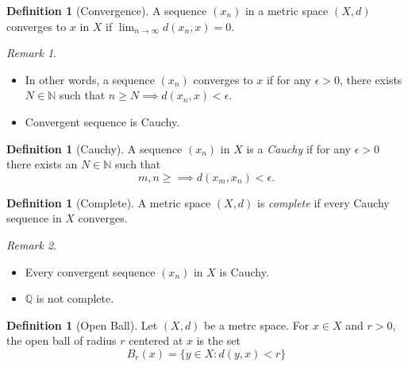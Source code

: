 \documentclass[12pt, lettersize]{article}
\theoremstyle{plain}
\theoremstyle{definition}
\newtheorem{dfn}[thm]{Definition}
\theoremstyle{remark}
\newtheorem*{rem}{Remark}
\newcommand{\N}{\mathbb{N}}
\newcommand{\Q}{\mathbb{Q}}
\begin{document}
\begin{dfn}[Convergence]
	A sequence $(x_n)$ in a metric space $(X,d)$ converges to $x$ in $X$ if $\lim_{n\rightarrow\infty}d(x_n,x)=0$.
\end{dfn}
\begin{rem}
\begin{itemize}
	\item In other words, a sequence $(x_n)$ converges to $x$ if for any $\epsilon>0$, there exists $N\in\N$ such that $n\geq N\implies d(x_n,x)<\epsilon$.
	\item Convergent sequence is Cauchy.
\end{itemize}
\end{rem}

\begin{dfn}[Cauchy]
	A sequence $(x_n)$ in $X$ is a \emph{Cauchy} if for any $\epsilon>0$ there exists an $N\in\N$ such that
	\begin{displaymath}
		m,n\geq\implies d(x_m,x_n)<\epsilon.
	\end{displaymath}
\end{dfn}

\begin{dfn}[Complete]
	A metric space $(X,d)$ is \emph{complete} if every Cauchy sequence in $X$ converges.
\end{dfn}
\begin{rem}
\begin{itemize}
	\item Every convergent sequence $(x_n)$ in $X$ is Cauchy.
	\item $\Q$ is not complete. 
\end{itemize}
\end{rem}

\begin{dfn}[Open Ball]
	Let $(X,d)$ be a metrc space. For $x\in X$ and $r>0$, the open ball of radius $r$ centered at $x$ is the set
	\begin{displaymath}
		B_r(x)=\{y\in X: d(y,x)<r\}
	\end{displaymath}
\end{dfn}
\end{document}
